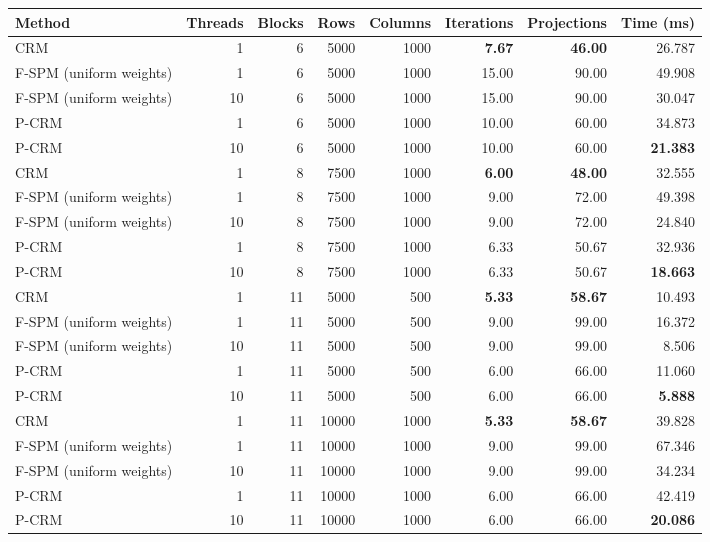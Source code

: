 \begin{tabular}{lrrrrrrr}
\toprule
Method & Threads & Blocks & Rows & Columns & Iterations & Projections & Time (ms) \\
\midrule
CRM & 1 & 6 & 5000 & 1000 & \textbf{7.67} & \textbf{46.00} & 26.787 \\
F-SPM (uniform weights) & 1 & 6 & 5000 & 1000 & 15.00 & 90.00 & 49.908 \\
F-SPM (uniform weights) & 10 & 6 & 5000 & 1000 & 15.00 & 90.00 & 30.047 \\
P-CRM & 1 & 6 & 5000 & 1000 & 10.00 & 60.00 & 34.873 \\
P-CRM & 10 & 6 & 5000 & 1000 & 10.00 & 60.00 & \textbf{21.383} \\
\midrule
CRM & 1 & 8 & 7500 & 1000 & \textbf{6.00} & \textbf{48.00} & 32.555 \\
F-SPM (uniform weights) & 1 & 8 & 7500 & 1000 & 9.00 & 72.00 & 49.398 \\
F-SPM (uniform weights) & 10 & 8 & 7500 & 1000 & 9.00 & 72.00 & 24.840 \\
P-CRM & 1 & 8 & 7500 & 1000 & 6.33 & 50.67 & 32.936 \\
P-CRM & 10 & 8 & 7500 & 1000 & 6.33 & 50.67 & \textbf{18.663} \\
\midrule
CRM & 1 & 11 & 5000 & 500 & \textbf{5.33} & \textbf{58.67} & 10.493 \\
F-SPM (uniform weights) & 1 & 11 & 5000 & 500 & 9.00 & 99.00 & 16.372 \\
F-SPM (uniform weights) & 10 & 11 & 5000 & 500 & 9.00 & 99.00 & 8.506 \\
P-CRM & 1 & 11 & 5000 & 500 & 6.00 & 66.00 & 11.060 \\
P-CRM & 10 & 11 & 5000 & 500 & 6.00 & 66.00 & \textbf{5.888} \\
\midrule
CRM & 1 & 11 & 10000 & 1000 & \textbf{5.33} & \textbf{58.67} & 39.828 \\
F-SPM (uniform weights) & 1 & 11 & 10000 & 1000 & 9.00 & 99.00 & 67.346 \\
F-SPM (uniform weights) & 10 & 11 & 10000 & 1000 & 9.00 & 99.00 & 34.234 \\
P-CRM & 1 & 11 & 10000 & 1000 & 6.00 & 66.00 & 42.419 \\
P-CRM & 10 & 11 & 10000 & 1000 & 6.00 & 66.00 & \textbf{20.086} \\

\end{tabular}

